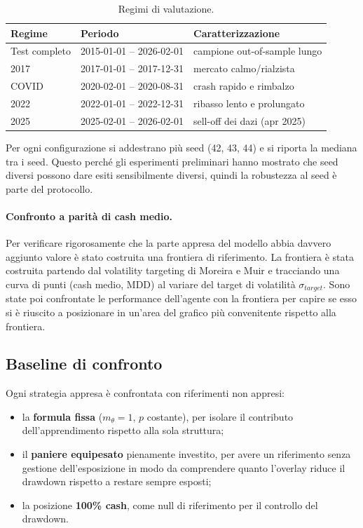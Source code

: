 \begin{table}[H]
\centering
\begin{tabular}{lll}
\toprule
Regime & Periodo & Caratterizzazione \\
\midrule
Test completo & 2015-01-01 -- 2026-02-01 & campione out-of-sample lungo \\
2017 & 2017-01-01 -- 2017-12-31 & mercato calmo/rialzista \\
COVID & 2020-02-01 -- 2020-08-31 & crash rapido e rimbalzo \\
2022 & 2022-01-01 -- 2022-12-31 & ribasso lento e prolungato \\
2025 & 2025-02-01 -- 2026-02-01 & sell-off dei dazi (apr 2025) \\
\bottomrule
\end{tabular}
\caption{Regimi di valutazione.}
\label{tab:regimi}
\end{table}

Per ogni configurazione si addestrano più seed (42, 43, 44) e si riporta
la mediana tra i seed. Questo perché gli esperimenti preliminari hanno
mostrato che seed diversi possono dare esiti sensibilmente diversi, quindi la
robustezza al seed è parte del protocollo.

\paragraph{Confronto a parità di cash medio.}
Per verificare rigorosamente che la parte appresa del modello abbia davvero aggiunto valore è stato costruita una frontiera di riferimento. 
La frontiera è stata costruita partendo dal volatility targeting di Moreira e Muir e tracciando una curva di punti (cash medio, MDD) al variare del target di volatilità $\sigma_{target}$.
Sono state poi confrontate le performance dell'agente con la frontiera per capire se esso si è riuscito a posizionare in un'area del grafico più convenitente rispetto alla frontiera.



\subsection{Baseline di confronto}
Ogni strategia appresa è confrontata con riferimenti non appresi:
\begin{itemize}
  \item la \textbf{formula fissa} ($m_\theta=1$, $p$ costante), per isolare il
        contributo dell'apprendimento rispetto alla sola struttura;
  \item il \textbf{paniere equipesato} pienamente investito, per avere un riferimento senza gestione dell'esposizione in modo da comprendere quanto l'overlay riduce il drawdown rispetto a restare sempre esposti;
  \item la posizione \textbf{100\% cash}, come null di riferimento per il
        controllo del drawdown.
\end{itemize}

